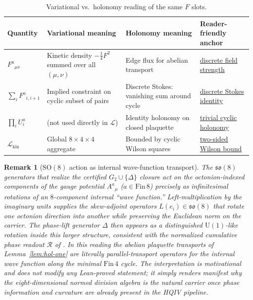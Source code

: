 \documentclass[11pt]{amsart}
\newtheorem{remark}[theorem]{Remark}
\begin{document}
\begin{table}[ht]
\caption{Variational vs.\ holonomy reading of the same \(F\) slots.}
\label{tab:two-views}
\centering
\small
\begin{tabular}{@{}p{2.4cm}p{3.5cm}p{3.4cm}p{3.6cm}@{}}
\hline
Quantity & Variational meaning & Holonomy meaning & Reader-friendly anchor \\
\hline
\(F^a{}_{\mu\nu}\) & Kinetic density \(-\tfrac14 F^2\) summed over all \((\mu,\nu)\) & Edge flux for abelian transport & \hyperref[lean:F-from-A]{discrete field strength} \\
\(\sum_i F^a{}_{i,i+1}\) & Implied constraint on cyclic subset of pairs & Discrete Stokes: vanishing sum around cycle & \hyperref[lean:cyclic-flux]{discrete Stokes identity} \\
\(\prod_i U^a_i\) & (not used directly in \(\mathcal{L}\)) & Identity holonomy on closed plaquette & \hyperref[lean:trivial-holonomy]{trivial cyclic holonomy} \\
\(\mathcal{L}_{\mathrm{kin}}\) & Global \(8\times 4\times 4\) aggregate & Bounded by cyclic Wilson squares & \hyperref[lean:wilson-bounds]{two-sided Wilson bound} \\
\hline
\end{tabular}
\end{table}

\begin{remark}[\texorpdfstring{$\mathrm{SO}(8)$ action as internal wave-function transport}{SO8 wave-function transport}]
\label{rem:so8-wavefunction}
The \(\mathfrak{so}(8)\) generators that realize the certified \(G_2\cup\{\Delta\}\) closure act on the octonion-indexed components of the gauge potential \(A^a{}_\mu\) (\(a\in \mathrm{Fin}\,8\)) precisely as infinitesimal rotations of an \(8\)-component internal ``wave function.'' Left-multiplication by the imaginary units supplies the skew-adjoint operators \(L(e_i)\in\mathfrak{so}(8)\) that rotate one octonion direction into another while preserving the Euclidean norm on the carrier. The phase-lift generator \(\Delta\) then appears as a distinguished \(\mathrm{U}(1)\)-like rotation inside this larger structure, consistent with the normalized cumulative phase readout \(\mathcal{R}\) of \cite{hqiv-so8-paper}. In this reading the abelian plaquette transports of Lemma~\ref{lem:hol-one} are literally parallel-transport operators for the internal wave function along the minimal \(\mathrm{Fin}\,4\) cycle. The interpretation is motivational and does not modify any Lean-proved statement; it simply renders manifest why the eight-dimensional normed division algebra is the natural carrier once phase information and curvature are already present in the HQIV pipeline.
\end{remark}
\end{document}
